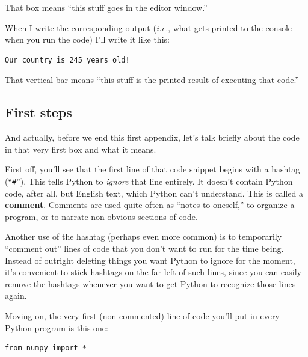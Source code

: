 That box means ``this stuff goes in the editor window.''

\medskip

When I write the corresponding output (\textit{i.e.}, what gets printed to the
console when you run the code) I'll write it like this:

\vspace{-.1in}
\begin{Verbatim}[fontsize=\small,samepage=true,frame=leftline,framesep=5mm,framerule=1mm]
Our country is 245 years old!
\end{Verbatim}
\vspace{-.1in}

That vertical bar means ``this stuff is the printed result of executing that
code.''

\medskip

\subsection*{First steps}

And actually, before we end this first appendix, let's talk briefly about the
code in that very first box and what it means.


First off, you'll see that the first line of that code snippet begins with a
hashtag (``\texttt{\#}''). This tells Python to \textit{ignore} that line
entirely. It doesn't contain Python code, after all, but English text, which
Python can't understand. This is called a \textbf{comment}. Comments are used
quite often as ``notes to oneself,'' to organize a program, or to narrate
non-obvious sections of code.

Another use of the hashtag (perhaps even more common) is to temporarily
``comment out'' lines of code that you don't want to run for the time being.
Instead of outright deleting things you want Python to ignore for the moment,
it's convenient to stick hashtags on the far-left of such lines, since you can
easily remove the hashtags whenever you want to get Python to recognize those
lines again.

\smallskip

Moving on, the very first (non-commented) line of code you'll put in every
Python program is this one:

\begin{Verbatim}[fontsize=\small,samepage=true,frame=single,framesep=3mm]
from numpy import *
\end{Verbatim}


